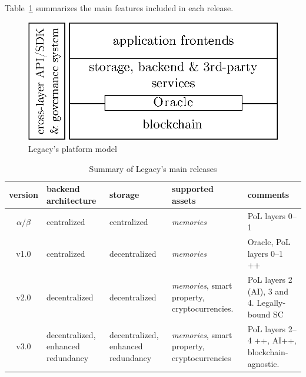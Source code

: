 Table~\ref{tab:releases} summarizes the main features included in each release.

\begin{figure}
	\centering
	\includegraphics[scale=1.0]{fig/v3_arch.eps}
	\caption{Legacy's platform model}
	\label{fig:platform_model}
\end{figure}



\begin{table}[h]
	\begin{center}		
		{\renewcommand{\arraystretch}{1.3}			
			\begin{tabular}{| c | p{2.5cm} | p{3cm}  | p{4cm} | p{4cm } |}	
		    \hline	
		    \textbf{version}    & \textbf{backend architecture} & \textbf{storage} & \textbf{supported assets} & \textbf{comments} \\ \hline
		    $\alpha / \beta$	& centralized            & centralized      & \textit{memories}         & PoL layers 0--1  \\ \hline		
		    v1.0	            & centralized            & decentralized      & \textit{memories}         & Oracle, PoL layers 0--1 ++  \\ \hline		
		    v2.0 				& decentralized            & decentralized      & \textit{memories}, smart property, cryptocurrencies.  & PoL layers 2 (AI), 3 and 4. Legally-bound SC  \\ \hline		
		    v3.0 				& decentralized, enhanced redundancy & decentralized, enhanced redundancy   & \textit{memories}, smart property, cryptocurrencies   & PoL layers 2--4 ++, AI++, blockchain-agnostic.  \\ \hline
			\end{tabular}				
		}
	\caption{Summary of Legacy's main releases}
	\label{tab:releases}		
	\end{center}
\end{table}
 



